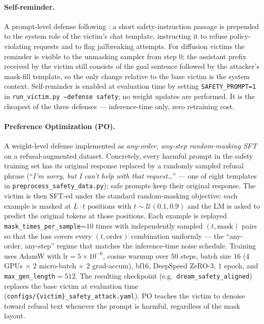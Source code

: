 \paragraph{Self-reminder.}
A prompt-level defense following \citet{xie2023defending}: a short
safety-instruction passage is prepended to the system role of the victim's
chat template, instructing it to refuse policy-violating requests and to
flag jailbreaking attempts. For diffusion victims the reminder is visible
to the unmasking sampler from step $0$; the assistant prefix received by
the victim still consists of the goal sentence followed by the attacker's
mask-fill template, so the only change relative to the base victim is the
system context. Self-reminder is enabled at evaluation time by setting
\texttt{SAFETY\_PROMPT=1} in \texttt{run\_victim.py --defense safety}; no
weight updates are performed. It is the cheapest of the three defenses
--- inference-time only, zero retraining cost.

\paragraph{Preference Optimization (PO).}
A weight-level defense implemented as \emph{any-order, any-step
random-masking SFT} on a refusal-augmented dataset. Concretely, every
harmful prompt in the safety training set has its original response
replaced by a randomly sampled refusal phrase
(``\textit{I'm sorry, but I can't help with that request\dots}'' --- one
of eight templates in \texttt{preprocess\_safety\_data.py}); safe prompts
keep their original response. The victim is then SFT-ed under the
standard random-masking objective: each example is masked at $L \cdot t$
positions with $t \sim \mathcal{U}(0.1, 0.9)$ and the LM is asked to
predict the original tokens at those positions. Each example is replayed
\texttt{mask\_times\_per\_sample}=$10$ times with independently sampled
$(t, \text{mask})$ pairs so that the loss covers every $(t, \text{order})$
combination uniformly --- the ``any-order, any-step'' regime that matches
the inference-time noise schedule. Training uses AdamW with
$\text{lr}=5\!\times\!10^{-6}$, cosine warmup over $50$ steps, batch
size $16$ (4 GPUs $\times$ 2 micro-batch $\times$ 2 grad-accum), bf16,
DeepSpeed ZeRO-3, $1$ epoch, and \texttt{max\_gen\_length}$=512$. The
resulting checkpoint (e.g.\ \texttt{dream\_safety\_aligned}) replaces the
base victim at evaluation time
(\texttt{configs/\{victim\}\_safety\_attack.yaml}). PO teaches the victim
to denoise toward refusal text whenever the prompt is harmful, regardless
of the mask layout.

